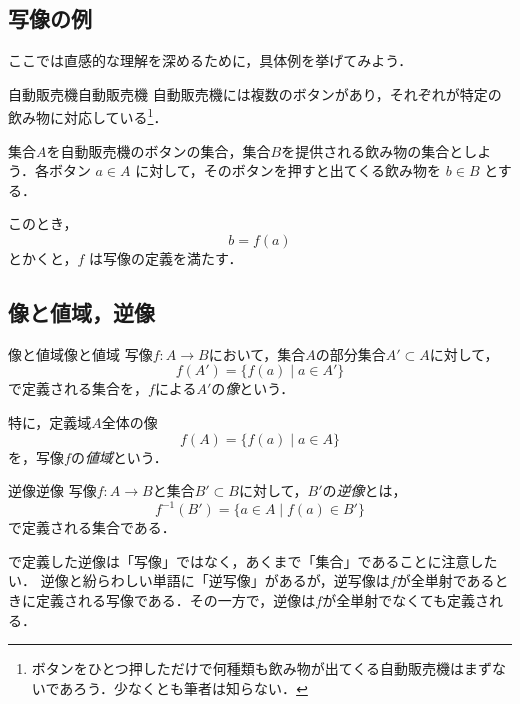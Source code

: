 \subsection{写像の例}

ここでは直感的な理解を深めるために，具体例を挙げてみよう．

\begin{example}{自動販売機}{自動販売機}
  自動販売機には複数のボタンがあり，それぞれが特定の飲み物に対応している\footnote{ボタンをひとつ押しただけで何種類も飲み物が出てくる自動販売機はまずないであろう．少なくとも筆者は知らない．}．

  集合$A$を自動販売機のボタンの集合，集合$B$を提供される飲み物の集合としよう．各ボタン $a \in A$ に対して，そのボタンを押すと出てくる飲み物を $b \in B$ とする．

  このとき，
  \[
    b=f(a)
  \]
  とかくと，$f$ は写像の定義を満たす．
\end{example}


\subsection{像と値域，逆像}

\begin{definition}{像と値域}{像と値域}
  写像$f \colon A \to B$において，集合$A$の部分集合$A' \subset A$に対して，
  \[
    f(A') = \{ f(a) \mid a \in A' \}
  \]
  で定義される集合を，$f$による$A'$の\emph{像}という．

  特に，定義域$A$全体の像
  \[
    f(A) = \{ f(a) \mid a \in A \}
  \]
  を，写像$f$の\emph{値域}という．

   
\end{definition}


\begin{definition}{逆像}{逆像}
  写像$f \colon A \to B$と集合$B' \subset B$に対して，$B'$の\emph{逆像}とは，
  \[
    f^{-1}(B') = \{ a \in A \mid f(a) \in B' \}
  \]
  で定義される集合である．

\end{definition}

\begin{mycolumn}
  で定義した逆像は「写像」ではなく，あくまで「集合」であることに注意したい．
  逆像と紛らわしい単語に「逆写像」があるが，逆写像は$f$が全単射であるときに定義される写像である．その一方で，逆像は$f$が全単射でなくても定義される．
\end{mycolumn}

